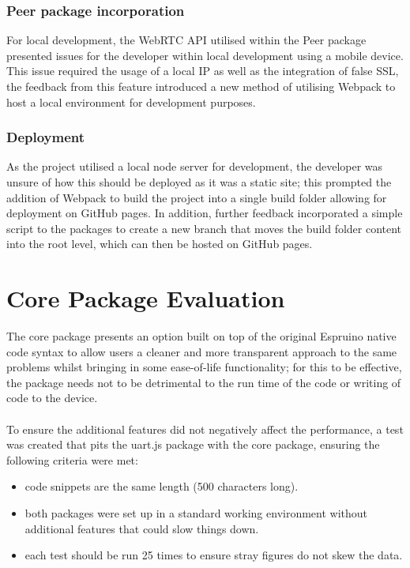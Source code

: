 \documentclass{l4proj}
\begin{document}
\subsubsection{Peer package incorporation}
For local development, the WebRTC API utilised within the Peer package presented issues for the developer within local development using a mobile device. This issue required the usage of a local IP as well as the integration of false SSL, the feedback from this feature introduced a new method of utilising Webpack to host a local environment for development purposes.
\subsubsection{Deployment}
As the project utilised a local node server for development, the developer was unsure of how this should be deployed as it was a static site; this prompted the addition of Webpack to build the project into a single build folder allowing for deployment on GitHub pages. In addition, further feedback incorporated a simple script to the packages to create a new branch that moves the build folder content into the root level, which can then be hosted on GitHub pages.
\section{Core Package Evaluation}

The core package presents an option built on top of the original Espruino native code syntax to allow users a cleaner and more transparent approach to the same problems whilst bringing in some ease-of-life functionality; for this to be effective, the package needs not to be detrimental to the run time of the code or writing of code to the device.
\\ \\
To ensure the additional features did not negatively affect the performance, a test was created that pits the uart.js package with the core package, ensuring the following criteria were met:

\begin{itemize}
    \item code snippets are the same length (500 characters long).
    \item both packages were set up in a standard working environment without additional features that could slow things down.
    \item each test should be run 25 times to ensure stray figures do not skew the data.
\end{itemize}
\end{document}
